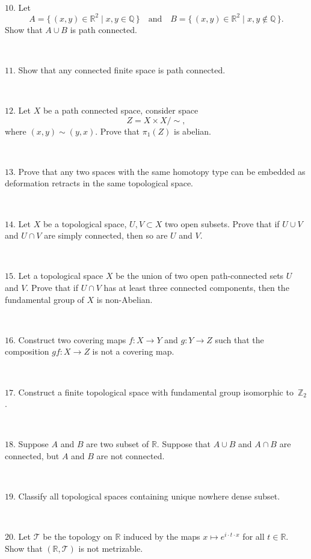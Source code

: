 \documentclass{article}
\def\noi{\noindent}%
\def\RR{\mathbb{R}}%
\def\ZZ{\mathbb{Z}}%
\def\QQ{\mathbb{Q}}%
\def\:{\colon}
\begin{document}
\ 

\noi $10.$ Let
\[A=\{\,(x,y)\in\RR^2\mid x,y\in\QQ\,\}
\quad\text{and}\quad
B=\{\,(x,y)\in\RR^2\mid x,y\notin\QQ\,\}.\]
Show that $A\cup B$ is path connected.

\ 

\noi $11.$ Show that any connected finite space is path connected.

\ 

\noi $12.$ Let $X$ be a path connected space, consider space 
$$Z=X\times X/\sim,$$
where $(x,y)\sim(y,x)$.
Prove that $\pi_1(Z)$ is abelian.

\ 

\noi $13.$ Prove that any two spaces with the same homotopy type 
can be embedded as
deformation retracts in the same topological space.

\ 

\noi $14.$ Let $X$ be a topological space, $U, V \subset  X$ two open subsets. 
Prove that if
$U \cup V$ and $U \cap V$ are simply connected, then so are $U$ and $V$.

\ 

\noi $15.$ Let a topological space $X$ be the union of two open path-connected sets $U$ and $V$. 
Prove that if $U\cap V$ has at least three connected components, then the fundamental group of $X$ is non-Abelian.

\ 

\noi $16.$ Construct two covering maps $f\:X\to Y$ and $g\:Y\to Z$ such that the composition $gf\:X\to Z$ is not a covering map.

\ 

\noi $17.$ Construct a finite topological space with fundamental group isomorphic to~$\ZZ_2$.

\ 

\noi $18.$ 
Suppose $A$ and $B$ are two subset of $\RR$.
Suppose that $A\cup B$ and $A \cap B$ are connected, but $A$ and $B$ are not connected.

\ 

\noi $19.$
Classify all topological spaces containing unique nowhere dense subset.


\ 

\noi $20.$ Let $\mathcal{T}$ be the topology on $\RR$ induced by the maps $x\mapsto e^{i\cdot t\cdot x}$ for all $t\in \RR$.
Show that $(\RR,\mathcal{T})$ is not metrizable.
\end{document}
